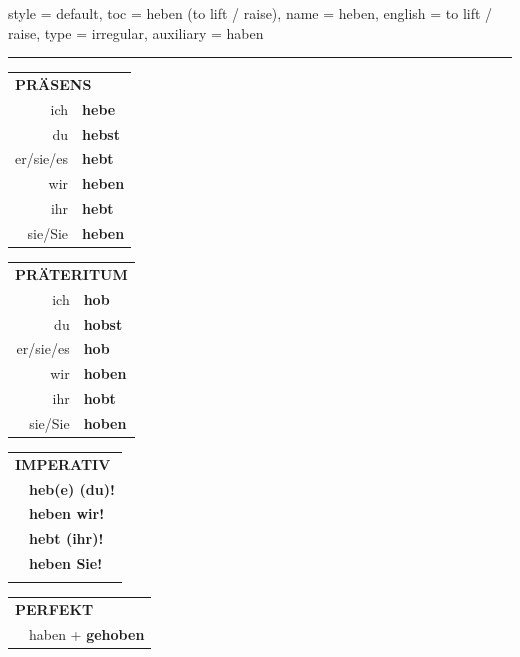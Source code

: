 \begin{verbentry}{
  style = {default},
  toc = {heben (to lift / raise)},
  name = {heben},
  english = {to lift / raise},
  type = {irregular},
  auxiliary = {haben}
}
 
    
     \vspace{5pt}

    \hrule
    
    \vspace{5pt}

  \begin{tabular}{rl}
     \multicolumn{2}{l}{\textbf{PRÄSENS} }\\
    ich & \textbf{hebe}\\
    du & \textbf{hebst}\\
    er/sie/es & \textbf{hebt}\\
    wir & \textbf{heben}\\
    ihr & \textbf{hebt}\\
    sie/Sie & \textbf{heben}\\
  \end{tabular}
  \hfill
     \begin{tabular}{rl}
    \multicolumn{2}{l}{\textbf{PRÄTERITUM} }\\
    ich & \textbf{hob}\\
    du & \textbf{hobst}\\
    er/sie/es & \textbf{hob}\\
    wir & \textbf{hoben}\\
    ihr & \textbf{hobt}\\
    sie/Sie & \textbf{hoben}\\
  \end{tabular}
  \hfill
  \begin{tabular}{rl}
     \multicolumn{2}{l}{\textbf{IMPERATIV} }\\
   & \textbf{heb(e) (du)!}\\
   & \textbf{heben wir!}\\
   & \textbf{hebt (ihr)!}\\
   & \textbf{heben Sie!}\\
   & \vspace{10pt}
  \end{tabular}

    \vspace{10pt}

 \begin{tabular}{rl}
     \multicolumn{2}{l}{\textbf{PERFEKT}}\\
   & haben + \textbf{gehoben}\\
  \end{tabular}
\hfill
   \begin{tabular}{rl}
   

\end{tabular}
\end{verbentry}
